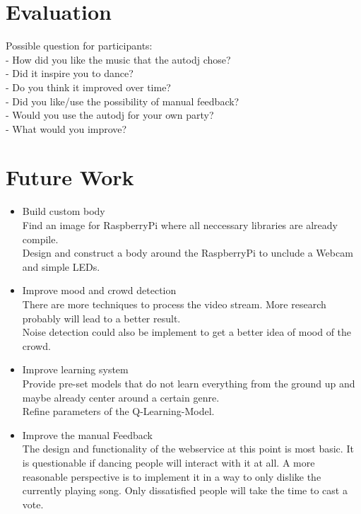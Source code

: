 \documentclass{article}
\begin{document}
\section{Evaluation}


Possible question for participants:\\
- How did you like the music that the autodj chose?\\
- Did it inspire you to dance?\\
- Do you think it improved over time?\\
- Did you like/use the possibility of manual feedback?\\
- Would you use the autodj for your own party?\\
- What would you improve?


\section{Future Work}


\begin{itemize}
    \item Build custom body\\
        Find an image for RaspberryPi where all neccessary libraries are already compile. \\
        Design and construct a body around the RaspberryPi to unclude a Webcam and simple LEDs.

    \item Improve mood and crowd detection\\
        There are more techniques to process the video stream. More research probably will lead to a better result.\\
        Noise detection could also be implement to get a better idea of mood of the crowd.

    \item Improve learning system \\
        Provide pre-set models that do not learn everything from the ground up and maybe already center around a certain genre.\\
        Refine parameters of the Q-Learning-Model.

    \item Improve the manual Feedback\\
        The design and functionality of the webservice at this point is most basic. It is questionable if dancing people will interact with it at all. A more reasonable perspective is to implement it in a way to only dislike the currently playing song. Only dissatisfied people will take the time to cast a vote.
\end{itemize}






\end{document}
